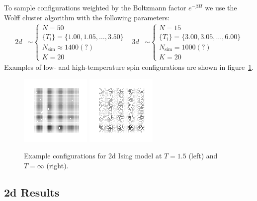 \documentclass[11pt]{article}
\begin{document}
To sample configurations weighted by the Boltzmann factor $e^{-\beta H}$ we use the Wolff cluster algorithm with the following parameters:
\begin{align}
    2d&\sim\left\{\begin{array}{l}
        N = 50\\
        \{T_i\} = \{1.00,1.05,\ldots,3.50\}\\
        N_\text{sim} \approx 1400 (?)\\
        K = 20
    \end{array}\right. & 3d&\sim\left\{\begin{array}{l}
        N = 15\\
        \{T_i\} = \{3.00,3.05,\ldots,6.00\}\\
        N_\text{sim} = 1000 (?)\\
        K = 20
    \end{array}\right.
\end{align}
Examples of low- and high-temperature spin configurations are shown in figure~\ref{fig:IsingExampleConfigs}.

\begin{figure}[h]
    \centering
    \includegraphics[width=0.3\textwidth]{ising_images/ising_T=150.png}
    \includegraphics[width=0.3\textwidth]{ising_images/ising_T=inf.png}
    \caption{Example configurations for 2d Ising model at $T=1.5$ (left) and $T=\infty$ (right).}
    \label{fig:IsingExampleConfigs}
\end{figure}

\subsection{2d Results}
\end{document}
